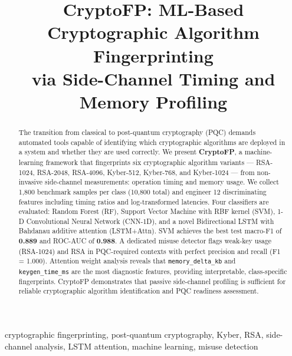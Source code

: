 \documentclass[conference]{IEEEtran}
\begin{document}
\title{CryptoFP: ML-Based Cryptographic Algorithm Fingerprinting\\
via Side-Channel Timing and Memory Profiling}

\author{
}

\maketitle

\begin{abstract}
The transition from classical to post-quantum cryptography (PQC) demands
automated tools capable of identifying which cryptographic algorithms are
deployed in a system and whether they are used correctly.
We present \textbf{CryptoFP}, a machine-learning framework that fingerprints
six cryptographic algorithm variants — RSA-1024, RSA-2048, RSA-4096,
Kyber-512, Kyber-768, and Kyber-1024 — from non-invasive side-channel
measurements: operation timing and memory usage.
We collect 1{,}800 benchmark samples per class (10{,}800 total) and engineer
12 discriminating features including timing ratios and log-transformed
latencies.
Four classifiers are evaluated: Random Forest (RF), Support Vector Machine
with RBF kernel (SVM), 1-D Convolutional Neural Network (CNN-1D), and a
novel Bidirectional LSTM with Bahdanau additive attention (LSTM+Attn).
SVM achieves the best test macro-F1 of \textbf{0.889} and ROC-AUC of
\textbf{0.988}.
A dedicated misuse detector flags weak-key usage (RSA-1024) and RSA in
PQC-required contexts with perfect precision and recall (F1 = 1.000).
Attention weight analysis reveals that \texttt{memory\_delta\_kb} and
\texttt{keygen\_time\_ms} are the most diagnostic features, providing
interpretable, class-specific fingerprints.
CryptoFP demonstrates that passive side-channel profiling is sufficient
for reliable cryptographic algorithm identification and PQC readiness
assessment.
\end{abstract}

\begin{IEEEkeywords}
cryptographic fingerprinting, post-quantum cryptography, Kyber, RSA,
side-channel analysis, LSTM attention, machine learning, misuse detection
\end{IEEEkeywords}
\end{document}
